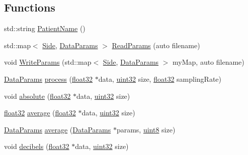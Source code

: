 \subsection*{Functions}
\begin{DoxyCompactItemize}
\item 
std\+::string \hyperlink{namespacevaso_a21e264fa912f7ca3f50e7e412ba1582e}{Patient\+Name} ()
\item 
std\+::map$<$ \hyperlink{namespacevaso_a77c5d9704657d49d456f691ddd8abf7c}{Side}, \hyperlink{structDataParams}{Data\+Params} $>$ \hyperlink{namespacevaso_afc1435dcb9c37b3ccde589738b26c909}{Read\+Params} (auto filename)
\item 
void \hyperlink{namespacevaso_ac272f5c7d73f350442d4657ef0258021}{Write\+Params} (std\+::map$<$ \hyperlink{namespacevaso_a77c5d9704657d49d456f691ddd8abf7c}{Side}, \hyperlink{structDataParams}{Data\+Params} $>$ my\+Map, auto filename)
\item 
\hyperlink{structDataParams}{Data\+Params} \hyperlink{namespacevaso_a8136a2891983f7a41768330e018e3232}{process} (\hyperlink{definitions_8hpp_aacdc525d6f7bddb3ae95d5c311bd06a1}{float32} $\ast$data, \hyperlink{definitions_8hpp_a1134b580f8da4de94ca6b1de4d37975e}{uint32} size, \hyperlink{definitions_8hpp_aacdc525d6f7bddb3ae95d5c311bd06a1}{float32} sampling\+Rate)
\item 
void \hyperlink{namespacevaso_a6ca90add966ce1773fc59a6883e6cd0c}{absolute} (\hyperlink{definitions_8hpp_aacdc525d6f7bddb3ae95d5c311bd06a1}{float32} $\ast$data, \hyperlink{definitions_8hpp_a1134b580f8da4de94ca6b1de4d37975e}{uint32} size)
\item 
\hyperlink{definitions_8hpp_aacdc525d6f7bddb3ae95d5c311bd06a1}{float32} \hyperlink{namespacevaso_ad3205136b1cd04b4c6b9d7be73661796}{average} (\hyperlink{definitions_8hpp_aacdc525d6f7bddb3ae95d5c311bd06a1}{float32} $\ast$data, \hyperlink{definitions_8hpp_a1134b580f8da4de94ca6b1de4d37975e}{uint32} size)
\item 
\hyperlink{structDataParams}{Data\+Params} \hyperlink{namespacevaso_a376413e791defec04a0faf329be1cbf4}{average} (\hyperlink{structDataParams}{Data\+Params} $\ast$params, \hyperlink{definitions_8hpp_adde6aaee8457bee49c2a92621fe22b79}{uint8} size)
\item 
void \hyperlink{namespacevaso_af9bb2211cf3478333dfc1873bf316263}{decibels} (\hyperlink{definitions_8hpp_aacdc525d6f7bddb3ae95d5c311bd06a1}{float32} $\ast$data, \hyperlink{definitions_8hpp_a1134b580f8da4de94ca6b1de4d37975e}{uint32} size)
\item 

\end{DoxyCompactItemize}
